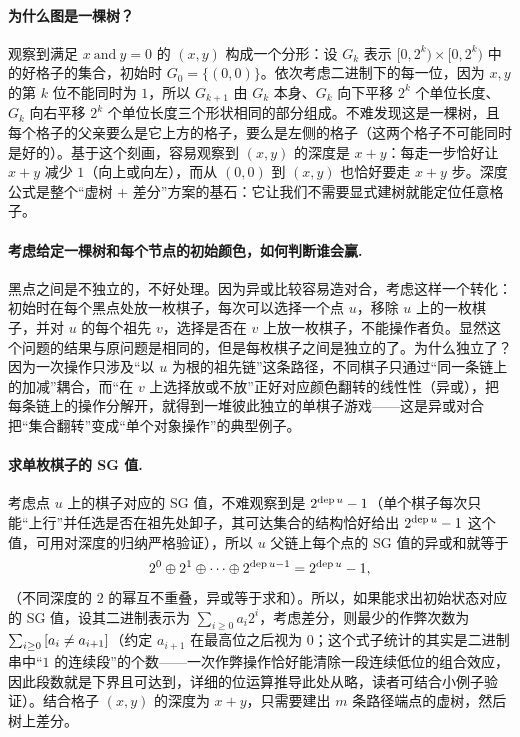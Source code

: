 \paragraph{为什么图是一棵树？} 观察到满足 $x\ \mathrm{and}\ y=0$ 的 $(x,y)$ 构成一个分形：设 $G_k$ 表示 $[0,2^{k})\times[0,2^{k})$ 中的好格子的集合，初始时 $G_0=\{(0,0)\}$。依次考虑二进制下的每一位，因为 $x,y$ 的第 $k$ 位不能同时为 $1$，所以 $G_{k+1}$ 由 $G_k$ 本身、$G_k$ 向下平移 $2^{k}$ 个单位长度、$G_k$ 向右平移 $2^{k}$ 个单位长度三个形状相同的部分组成。不难发现这是一棵树，且每个格子的父亲要么是它上方的格子，要么是左侧的格子（这两个格子不可能同时是好的）。基于这个刻画，容易观察到 $(x,y)$ 的深度是 $x+y$：每走一步恰好让 $x+y$ 减少 $1$（向上或向左），而从 $(0,0)$ 到 $(x,y)$ 也恰好要走 $x+y$ 步。深度公式是整个“虚树 + 差分”方案的基石：它让我们不需要显式建树就能定位任意格子。

\paragraph{考虑给定一棵树和每个节点的初始颜色，如何判断谁会赢.} 黑点之间是不独立的，不好处理。因为异或比较容易造对合，考虑这样一个转化：初始时在每个黑点处放一枚棋子，每次可以选择一个点 $u$，移除 $u$ 上的一枚棋子，并对 $u$ 的每个祖先 $v$，选择是否在 $v$ 上放一枚棋子，不能操作者负。显然这个问题的结果与原问题是相同的，但是每枚棋子之间是独立的了。为什么独立了？因为一次操作只涉及“以 $u$ 为根的祖先链”这条路径，不同棋子只通过“同一条链上的加减”耦合，而“在 $v$ 上选择放或不放”正好对应颜色翻转的线性性（异或），把每条链上的操作分解开，就得到一堆彼此独立的单棋子游戏——这是异或对合把“集合翻转”变成“单个对象操作”的典型例子。

\paragraph{求单枚棋子的 SG 值.} 考虑点 $u$ 上的棋子对应的 SG 值，不难观察到是 $2^{\operatorname{dep} u}-1$（单个棋子每次只能“上行”并任选是否在祖先处卸子，其可达集合的结构恰好给出 $2^{\operatorname{dep} u}-1$ 这个值，可用对深度的归纳严格验证），所以 $u$ 父链上每个点的 SG 值的异或和就等于
\[
 2^{0}\oplus2^{1}\oplus\cdots\oplus2^{\operatorname{dep} u-1}=2^{\operatorname{dep} u}-1,
\]
（不同深度的 $2$ 的幂互不重叠，异或等于求和）。所以，如果能求出初始状态对应的 SG 值，设其二进制表示为 $\sum_{i\ge0}a_i2^{i}$，考虑差分，则最少的作弊次数为 $\sum_{i\ge0}\left[a_i\ne a_{i+1}\right]$（约定 $a_{i+1}$ 在最高位之后视为 $0$；这个式子统计的其实是二进制串中“$1$ 的连续段”的个数——一次作弊操作恰好能清除一段连续低位的组合效应，因此段数就是下界且可达到，详细的位运算推导此处从略，读者可结合小例子验证）。结合格子 $(x,y)$ 的深度为 $x+y$，只需要建出 $m$ 条路径端点的虚树，然后树上差分。

